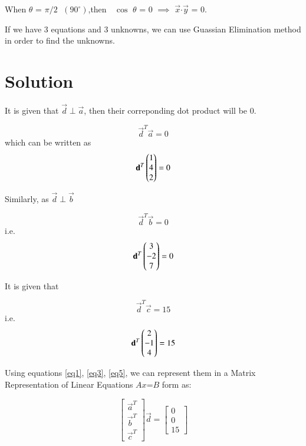 \documentclass[journal,12pt,twocolumn]{IEEEtran}
\begin{document}
	When $\theta$ = $\pi/2$ $\;$$(90^\circ)$,then $\;$ $\cos$ $\theta$  = 0 $\implies$ $\vec{x}$$\cdot$$\vec{y}$ = 0.
	
	If we have 3 equations and 3 unknowns, we can use Guassian Elimination method in order to find the unknowns.
	
\section{\textbf{Solution}}

	It is given that $\vec{d}\perp\vec{a}$, then their correponding dot product will be 0.\hfill \break
	
	\begin{equation}\label{eq1}
		\vec{d}^{T}\vec{a} = 0
	\end{equation} 		
	which can be written as 
	\begin{equation}\label{eq2}
		\mathbf{d}^{T} \begin{pmatrix}1\\4\\2\end{pmatrix} = 0
	\end{equation}

	Similarly, as $\vec{d}\perp\vec{b}$
 
	\begin{equation}\label{eq3}
		\vec{d}^{T}\vec{b} = 0 
	\end{equation}
	i.e.\begin{equation}\label{eq4}
			\mathbf{d}^{T} \begin{pmatrix}3\\-2\\7\end{pmatrix} = 0  
	\end{equation} 

	It is given that
	
	\begin{equation}\label{eq5}
		\vec{d}^{T}\vec{c} = 15 
	\end{equation}
	i.e.\begin{equation}\label{eq6}
		\mathbf{d}^{T} \begin{pmatrix}2\\-1\\4\end{pmatrix} = 15  
	\end{equation}
	
    Using equations \ref{eq1}, \ref{eq3}, \ref{eq5}, we can represent them in a Matrix Representation of Linear Equations $A$$x$=$B$ form as:
 
    	\[
    	\begin{bmatrix}
    		\vec{a}^{T} \\
    		\vec{b}^{T} \\
    		\vec{c}^{T} 
    	\end{bmatrix}
    	\vec{d}
    	=
    	\begin{bmatrix}
    		0 \\ 0 \\ 15
    	\end{bmatrix}
    	\]
    
\end{document}
